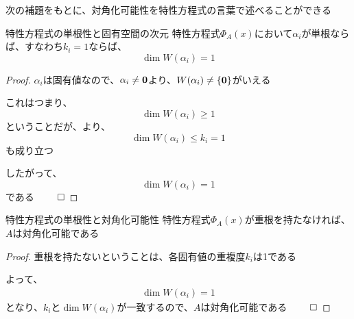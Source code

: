 \documentclass[../../../topic_linear-algebra]{subfiles}
\begin{document}
\sectionline

次の補題をもとに、対角化可能性を特性方程式の言葉で述べることができる

\begin{theorem*}{特性方程式の単根性と固有空間の次元}
  特性方程式$\Phi_A(x)$において$\alpha_i$が単根ならば、すなわち$k_i = 1$ならば、
  \begin{equation*}
    \dim W(\alpha_i) = 1
  \end{equation*}
\end{theorem*}

\begin{proof}
  $\alpha_i$は固有値なので、$\alpha_i \neq \vb*{0}$より、$W(\alpha_i) \neq \{\vb*{0}\}$がいえる

  これはつまり、
  \begin{equation*}
    \dim W(\alpha_i) \geq 1
  \end{equation*}
  ということだが、より、
  \begin{equation*}
    \dim W(\alpha_i) \leq k_i = 1
  \end{equation*}
  も成り立つ

  したがって、
  \begin{equation*}
    \dim W(\alpha_i) = 1
  \end{equation*}
  である $\qed$
\end{proof}

\br

\begin{theorem*}{特性方程式の単根性と対角化可能性}
  特性方程式$\Phi_A(x)$が重根を持たなければ、$A$は対角化可能である
\end{theorem*}

\begin{proof}
  重根を持たないということは、各固有値の重複度$k_i$は1である

  よって、
  \begin{gather*}
    \dim W(\alpha_i) = 1
  \end{gather*}
  となり、$k_i$と$\dim W(\alpha_i)$が一致するので、$A$は対角化可能である  $\qed$
\end{proof}
\end{document}
